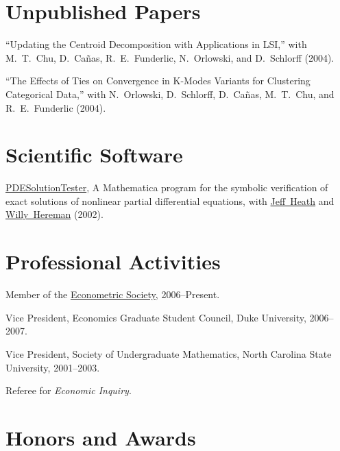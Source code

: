\documentclass[11pt,letterpaper]{article}
\renewenvironment{itemize}{
  \begin{list}{}
    { \setlength{\itemsep}{5pt}
      \setlength{\parsep}{0pt}
      \setlength{\topsep}{0pt}
      \setlength{\leftmargin}{0em} } }{
  \end{list}}
\begin{document}
\section*{Unpublished Papers}

``Updating the Centroid Decomposition with Applications in LSI,''
with M.\ T.\ Chu, D.\ Ca\~{n}as, R.\ E.\ Funderlic, N.\ Orlowski, and
D.\ Schlorff (2004).

``The Effects of Ties on Convergence in K-Modes Variants for
Clustering Categorical Data,'' with N.\ Orlowski, D.\ Schlorff, D.\
Ca\~{n}as, M.\ T.\ Chu, and R.\ E.\ Funderlic (2004).


\section*{Scientific Software}

\href{http://jblevins.org/research/pdest}{PDESolutionTester}, A
Mathematica program for the symbolic verification of exact solutions of
nonlinear partial differential equations, with
\href{http://web.centre.edu/jeffrey.heath/}{Jeff\ Heath} and
\href{http://www.mines.edu/fs_home/whereman/}{Willy\ Hereman} (2002).


\section*{Professional Activities}

\begin{itemize}
\item Member of the
  \href{http://www.econometricsociety.org/}{Econometric Society},
  2006--Present.
\item Vice President, Economics Graduate Student Council, Duke University,
  2006--2007.
\item Vice President, Society of Undergraduate Mathematics, North
  Carolina State University, 2001--2003.
\item Referee for {\em Economic Inquiry}.
\end{itemize}


\section*{Honors and Awards}
\end{document}

